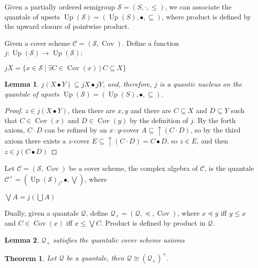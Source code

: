 \documentclass[a4paper]{article}
\theoremstyle{defin}
\theoremstyle{theorem}
\newtheorem{theorem}{Theorem}
\theoremstyle{claim}
\theoremstyle{prop}
\theoremstyle{lemma}
\newtheorem{lemma}{Lemma}
\theoremstyle{fact}
\theoremstyle{ex}
\theoremstyle{col}
\begin{document}
Given a partially ordered semigroup $\mathcal{S} = (S, \cdot, \leq)$, we can associate the quantale of upsets $\operatorname{Up}(\mathcal{S}) = (\operatorname{Up}(S), \bullet, \subseteq)$, where product is defined by the upward closure of pointwise product.

Given a cover scheme $\mathcal{C} = (\mathcal{S}, \operatorname{Cov})$. Define a function $j : \operatorname{Up}(\mathcal{S}) \to \operatorname{Up}(\mathcal{S})$:
\begin{center}
$j X = \{ x \in \mathcal{S} \: | \: \exists C \in \operatorname{Cov}(x) \: | \: C \subseteq X \}$
\end{center}

\begin{lemma}
$j (X \bullet Y) \subseteq j X \bullet j Y$, and, therefore, $j$ is a quantic nucleus on the quantale of upsets $\operatorname{Up}(\mathcal{S}) = (\operatorname{Up}(S), \bullet, \subseteq)$.
\end{lemma}

\begin{proof}
$z \in j (X \bullet Y)$, then there are $x, y$ and there are $C \subseteq X$ and $D \subseteq Y$ such that $C \in \operatorname{Cov}(x)$ and $D \in \operatorname{Cov}(y)$ by the definition of $j$. By the forth axiom, $C \cdot D$ can be refined by an $x \cdot y$-cover $A \subseteq \uparrow (C \cdot D)$, so by the third axiom there exists a $z$-cover $E \subseteq \uparrow (C \cdot D) = C \bullet D$, so $z \in E$, and then $z \in j (C \bullet D)$
\end{proof}

Let $\mathcal{C} = (\mathcal{S}, \operatorname{Cov})$ be a cover scheme, the complex algebra of $\mathcal{C}$, is the quantale $\mathcal{C}^{+} = (\operatorname{Up}(\mathcal{S})_j, \bullet, \bigvee)$, where
\begin{center}
$\bigvee A = j (\bigcup A)$
\end{center}

Dually, given a quantale $\mathcal{Q}$, define $\mathcal{Q}_+ = (\mathcal{Q}, \preceq, \operatorname{Cov})$, where
$x \preceq y$ iff $y \leq x$ and $C \in \operatorname{Cov}(x)$ iff $x \leq \bigvee C$. Product is defined by product in $\mathcal{Q}$.

\begin{lemma}
$\mathcal{Q}_+$ satisfies the quantalic cover scheme axioms
\end{lemma}

\begin{theorem}
Let $\mathcal{Q}$ be a quantale, then $\mathcal{Q} \cong (\mathcal{Q}_+)^+$.
\end{theorem}
\end{document}
